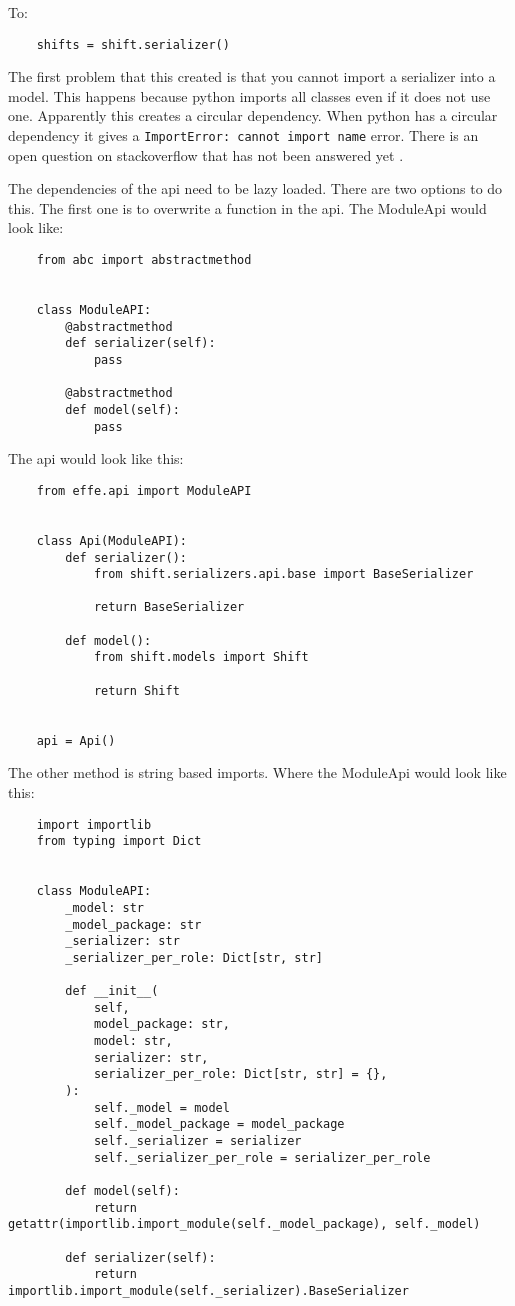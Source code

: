 To:
\begin{verbatim}
    shifts = shift.serializer()
\end{verbatim}

The first problem that this created is that you cannot import a serializer into a model. This happens because python imports all classes even if it does not use one. Apparently this creates a circular dependency. When python has a circular dependency it gives a \texttt{ImportError: cannot import name} error. There is an open question on stackoverflow that has not been answered yet \cite{circularDependencyQuestion}.

The dependencies of the api need to be lazy loaded. There are two options to do this. The first one is to overwrite a function in the api. The ModuleApi would look like:
\begin{verbatim}
    from abc import abstractmethod


    class ModuleAPI:
        @abstractmethod
        def serializer(self):
            pass

        @abstractmethod
        def model(self):
            pass
\end{verbatim}

The api would look like this:
\begin{verbatim}
    from effe.api import ModuleAPI


    class Api(ModuleAPI):
        def serializer():
            from shift.serializers.api.base import BaseSerializer

            return BaseSerializer

        def model():
            from shift.models import Shift

            return Shift


    api = Api()
\end{verbatim}

The other method is string based imports. Where the ModuleApi would look like this:
\begin{verbatim}
    import importlib
    from typing import Dict


    class ModuleAPI:
        _model: str
        _model_package: str
        _serializer: str
        _serializer_per_role: Dict[str, str]

        def __init__(
            self,
            model_package: str,
            model: str,
            serializer: str,
            serializer_per_role: Dict[str, str] = {},
        ):
            self._model = model
            self._model_package = model_package
            self._serializer = serializer
            self._serializer_per_role = serializer_per_role

        def model(self):
            return getattr(importlib.import_module(self._model_package), self._model)

        def serializer(self):
            return importlib.import_module(self._serializer).BaseSerializer
\end{verbatim}

